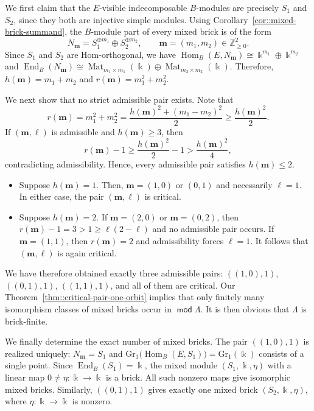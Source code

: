 \documentclass[a4,12pt]{amsart}
\numberwithin{equation}{section} %
\def\Hom{\operatorname{Hom}} %
\def\End{\operatorname{End}} %
\newcommand{\Mat}{\operatorname{Mat}}
\def\mod{\operatorname{\mathsf{mod}}}
\def\Gr{\mathrm{Gr}} %
\theoremstyle{definition} %
\begin{document}
We first claim that the $E$-visible indecomposable $B$-modules are precisely $S_1$ and $S_2$, since they both are injective simple modules. Using Corollary~\ref{cor::mixed-brick-summand}, the $B$-module part of every mixed brick is of the form
\[
N_{\mathbf{m}} = S_1^{\oplus m_1}\oplus S_2^{\oplus m_2},
\qquad
\mathbf{m}=(m_1,m_2)\in\mathbb{Z}_{\geq 0}^2.
\]
Since $S_1$ and $S_2$ are Hom-orthogonal, we have $\Hom_B(E,N_{\mathbf{m}}) \cong \Bbbk^{m_1}\oplus\Bbbk^{m_2}$ and $\End_B(N_{\mathbf{m}}) \cong \Mat_{m_1\times m_1}(\Bbbk)\oplus \Mat_{m_2\times m_2}(\Bbbk)$. Therefore, $h(\mathbf{m})=m_1+m_2$ and $r(\mathbf{m})=m_1^2+m_2^2$. 

We next show that no strict admissible pair exists. Note that
\[
r(\mathbf{m})
=
m_1^2+m_2^2
=
\frac{h(\mathbf{m})^2+(m_1-m_2)^2}{2}
\geq
\frac{h(\mathbf{m})^2}{2}.
\]
If $(\mathbf{m},\ell)$ is admissible and $h(\mathbf{m})\geq3$, then
\[
r(\mathbf{m})-1
\geq
\frac{h(\mathbf{m})^2}{2}-1
>
\frac{h(\mathbf{m})^2}{4},
\]
contradicting admissibility. Hence, every admissible pair satisfies $h(\mathbf{m})\leq2$.
\begin{itemize}
\item Suppose $h(\mathbf{m})=1$. Then, $\mathbf{m}=(1,0)$ or $(0,1)$ and necessarily $\ell=1$. In either case, the pair $(\mathbf{m}, \ell)$ is critical.

\item Suppose $h(\mathbf{m})=2$. If $\mathbf{m}=(2,0)$ or $\mathbf{m}=(0,2)$, then $r(\mathbf{m})-1=3>1\geq \ell(2-\ell)$ and no admissible pair occurs. If $\mathbf{m}=(1,1)$, then $r(\mathbf{m})=2$ and admissibility forces $\ell=1$. It follows that $(\mathbf{m}, \ell)$ is again critical.
\end{itemize}
We have therefore obtained exactly three admissible pairs: $((1,0),1)$, $((0,1),1)$, $((1,1),1)$, and all of them are critical. Our
Theorem~\ref{thm::critical-pair-one-orbit} implies that only finitely
many isomorphism classes of mixed bricks occur in $\mod \Lambda$. It is then obvious that $\Lambda$ is brick-finite.

We finally determine the exact number of mixed bricks. The pair $((1,0),1)$ is realized uniquely: $N_{\mathbf{m}}=S_1$ and $\Gr_1\bigl(\Hom_B(E,S_1)\bigr) = \Gr_1(\Bbbk)$ consists of a single point. Since $\End_B(S_1)=\Bbbk$, the mixed module $(S_1, \Bbbk, \eta)$ with a linear map $0\neq \eta\colon \Bbbk \rightarrow \Bbbk$ is a brick. All such nonzero maps give isomorphic mixed bricks. Similarly, $((0,1),1)$ gives exactly one mixed brick
$(S_2,\Bbbk,\eta)$, where
$\eta\colon\Bbbk\rightarrow\Bbbk$ is nonzero.
\end{document}
